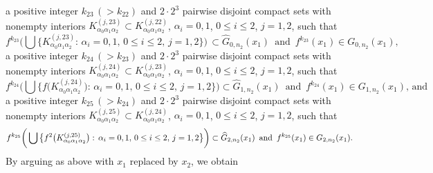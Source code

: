 \documentclass[12pt]{article}
\newcommand{\al}{\alpha}
\begin{document}
\noindent
a positive integer $k_{23} \, (> k_{22})$ and $2 \cdot 2^3$ pairwise disjoint compact sets with nonempty interiors $K_{\al_0\al_1\al_2}^{(j,23)} \subset K_{\al_0\al_1\al_2}^{(j,22)}$, $\al_i = 0, 1$, $0 \le i \le 2$, $j = 1, 2$, such that 
$$
f^{k_{23}}\bigg(\bigcup \big\{ K_{\al_0\al_1\al_2}^{(j,23)}: \, \al_i = 0, 1, \, 0 \le i \le 2, \, j = 1, 2 \big\}\bigg) \, \subset \widehat G_{0,n_2}(x_1) \,\,\, \text{and} \,\,\, f^{k_{23}}(x_1) \in G_{0,n_2}(x_1),
$$
a positive integer $k_{24} \, (> k_{23})$ and $2 \cdot 2^3$ pairwise disjoint compact sets with nonempty interiors $K_{\al_0\al_1\al_2}^{(j,24)} \subset K_{\al_0\al_1\al_2}^{(j,23)}$, $\al_i = 0, 1$, $0 \le i \le 2$, $j = 1, 2$, such that 
$$
f^{k_{24}}\bigg(\bigcup \big\{ f\big(K_{\al_0\al_1\al_2}^{(j,24)}\big): \, \al_i = 0, 1, \, 0 \le i \le 2, \, j = 1, 2 \big\}\bigg) \subset \widehat G_{1,n_2}(x_1) \,\,\, \text{and} \,\,\, f^{k_{24}}(x_1) \in G_{1,n_2}(x_1), \, \text{and}
$$
a positive integer $k_{25} \, (> k_{24})$ and $2 \cdot 2^3$ pairwise disjoint compact sets with nonempty interiors $K_{\al_0\al_1\al_2}^{(j,25)} \subset K_{\al_0\al_1\al_2}^{(j,24)}$, $\al_i = 0, 1$, $0 \le i \le 2$, $j = 1, 2$, such that 
$$
f^{k_{25}}\bigg(\bigcup \big\{ f^2\big(K_{\al_0\al_1\al_2}^{(j,25)}\big): \, \al_i = 0, 1, \, 0 \le i \le 2, \, j = 1, 2 \big\}\bigg) \subset \widehat G_{2,n_2}(x_1) \,\,\, \text{and} \,\,\, f^{k_{25}}(x_1) \in G_{2,n_2}(x_1).\vspace{.1in}
$$
\indent By arguing as above with $x_1$ replaced by $x_2$, we obtain 
\end{document}
